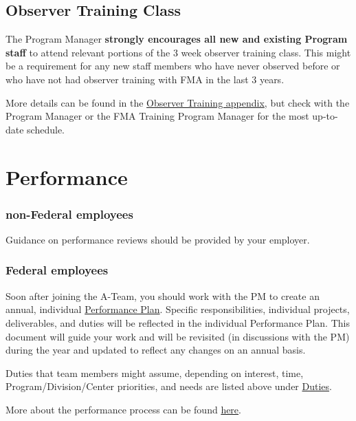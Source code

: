 \documentclass[
  letterpaper,
  DIV=11,
  numbers=noendperiod]{scrreprt}
\begin{document}
\subsection{Observer Training Class}\label{observer-training-class}

The Program Manager \textbf{strongly encourages all new and existing
Program staff} to attend relevant portions of the 3 week observer
training class. This might be a requirement for any new staff members
who have never observed before or who have not had observer training
with FMA in the last 3 years.

More details can be found in the
\href{observer-training-classes.qmd}{Observer Training appendix}, but
check with the Program Manager or the FMA Training Program Manager for
the most up-to-date schedule.

\section{Performance}\label{sec-perf}

\subsubsection{non-Federal employees}\label{non-federal-employees-3}

Guidance on performance reviews should be provided by your employer.

\subsubsection{Federal employees}\label{federal-employees-3}

Soon after joining the A-Team, you should work with the PM to create an
annual, individual
\href{https://drive.google.com/file/d/18veCUTjncQVhRY6jOou9kclKWXJssOca/view?pli=1}{Performance
Plan}. Specific responsibilities, individual projects, deliverables, and
duties will be reflected in the individual Performance Plan. This
document will guide your work and will be revisited (in discussions with
the PM) during the year and updated to reflect any changes on an annual
basis.

Duties that team members might assume, depending on interest, time,
Program/Division/Center priorities, and needs are listed above under
\hyperref[duties]{Duties}.

More about the performance process can be found
\href{https://sites.google.com/noaa.gov/inside-fisheries-hc/human-capital/performance-culture-incentive-and-honorary-awards/commerce-alternative-personnel-system-caps}{here}.
\end{document}
